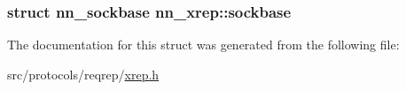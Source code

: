 \subsubsection[{sockbase}]{\setlength{\rightskip}{0pt plus 5cm}struct {\bf nn\+\_\+sockbase} nn\+\_\+xrep\+::sockbase}\hypertarget{structnn__xrep_add8f981681f3c0a7a4d33b291769d9de}{}\label{structnn__xrep_add8f981681f3c0a7a4d33b291769d9de}


The documentation for this struct was generated from the following file\+:\begin{DoxyCompactItemize}
\item 
src/protocols/reqrep/\hyperlink{xrep_8h}{xrep.\+h}\end{DoxyCompactItemize}
